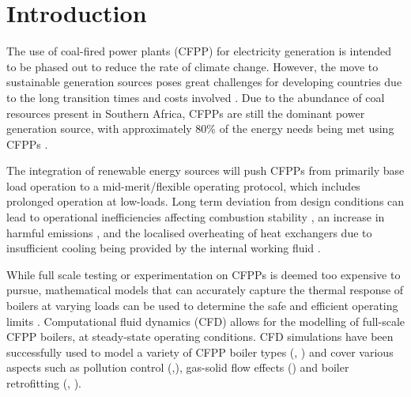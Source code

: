 \documentclass[11pt,cleanfoot]{asme2ej}
\begin{document}
\begin{nomenclature}
\begin{multicols}{2}
\entry{}{[$W/m^2K^4$]}
\end{multicols}
\end{nomenclature}


\section{Introduction}
The use of coal-fired power plants (CFPP) for electricity generation is intended to be phased out to reduce the rate of climate change. However, the move to sustainable generation sources poses great challenges for developing countries due to the long transition times and costs involved \cite{ugum2019}. Due to the abundance of coal resources present in Southern Africa, CFPPs are still the dominant power generation source, with approximately 80\% of the energy needs being met using CFPPs \cite{eskom}.

The integration of renewable energy sources will push CFPPs from primarily base load operation to a mid-merit/flexible operating protocol, which includes prolonged operation at low-loads. Long term deviation from design conditions can lead to operational inefficiencies affecting combustion stability \cite{Hernik2020}, an increase in harmful emissions \cite{Chang2021}, and the localised overheating of heat exchangers due to insufficient cooling being provided by the internal working fluid \cite{Modlinski2019}.

While full scale testing or experimentation on CFPPs is deemed too expensive to pursue, mathematical models that can accurately capture the thermal response of boilers at varying loads can be used to determine the safe and efficient operating limits \cite{Laubscher2019b}. Computational fluid dynamics (CFD) allows for the modelling of full-scale CFPP boilers, at steady-state operating conditions. CFD simulations have been successfully used to model a variety of CFPP boiler types (\cite{Laubscher2019a}, \cite{Gu2020}) and cover various aspects such as pollution control (\cite{Du2017},\cite{Fan2001}), gas-solid flow effects (\cite{Chen2017}) and boiler retrofitting (\cite{Gu2020}, \cite{He2007}).
\end{document}
